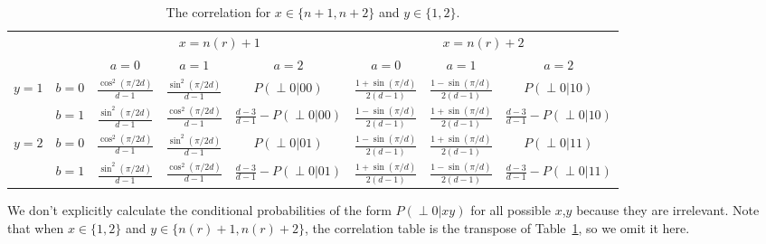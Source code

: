 \documentclass[11pt,letterpaper]{article}
\newcommand{\1}{\mathbb{1}}
\newcommand{\nr}{n(r)}
\newcommand{\pr}[2]{P(#1|#2)}
\theoremstyle{definition}
\begin{document}
\begin{table}[H]
\begin{center}
\begin{tabular}{|c|c||c|c|c|c|c|c|}
\hline
\multicolumn{2}{|c|}{} &
\multicolumn{3}{|c|}{$x=\nr+1$}&
\multicolumn{3}{|c|}{$x=\nr+2$} \\
\cline{3-8}
\multicolumn{2}{|c|}{} &
$a = 0$ & $a=1$ & $a=2$ &
$a = 0$ & $a=1$ & $a=2$\\
\hline
\hline
\multirow{2}{*}{$y = 1$} & $b=0$ & $\frac{\cos^2(\pi/2d)}{d-1}$ & $\frac{\sin^2(\pi/2d)}{d-1}$ & \small $\pr{\perp0}{00}$ 
& $\frac{1+\sin(\pi/d)}{2(d-1)}$ & $\frac{1-\sin(\pi/d)}{2(d-1)}$ & \small  $\pr{\perp0}{10}$ \\
\cline{2-8}
&$b=1$ & $\frac{\sin^2(\pi/2d)}{d-1}$ & $\frac{\cos^2(\pi/2d)}{d-1}$ & $\frac{d-3}{d-1}-\pr{\perp0}{00}$ 
&  $\frac{1-\sin(\pi/d)}{2(d-1)}$ & $\frac{1+\sin(\pi/d)}{2(d-1)}$ & \small $\frac{d-3}{d-1} - \pr{\perp0}{10}$  \\
\hline
\multirow{2}{*}{$y = 2$} & $b=0$ & $\frac{\cos^2(\pi/2d)}{d-1}$ & $\frac{\sin^2(\pi/2d)}{d-1}$ & \small $\pr{\perp0}{01}$ & 
$ \frac{1-\sin(\pi/d)}{2(d-1)}$ & $ \frac{1+\sin(\pi/d)}{2(d-1)}$ & \small $\pr{\perp 0}{11}$  \\
\cline{2-8}
&$b=1$ & $\frac{\sin^2(\pi/2d)}{d-1}$ & $\frac{\cos^2(\pi/2d)}{d-1}$ & \small $\frac{d-3}{d-1}-\pr{\perp0}{01}$ &  
$ \frac{1+\sin(\pi/d)}{2(d-1)}$ & $ \frac{1-\sin(\pi/d)}{2(d-1)}$ & \small $\frac{d-3}{d-1}- \pr{\perp 0}{11}$ \\
\hline
\end{tabular}
\end{center}
\caption{The correlation for $x \in \{n+1, n+2\}$ and $y \in \{1,2\}$.}
\label{tb:chsh}
\end{table}
We don't explicitly calculate the conditional probabilities of the form $\pr{\perp 0}{xy}$ for all possible $x$,$y$ 
because they are irrelevant.
Note that when $x \in \{1,2\}$ and $y \in \{\nr+1, \nr+2\}$, the correlation table is 
the transpose of Table~\ref{tb:chsh}, so we omit it here.
\end{document}
